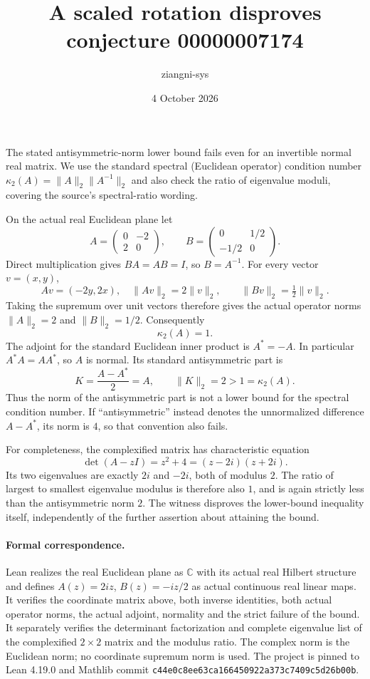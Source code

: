 \documentclass[11pt]{article}
\title{A scaled rotation disproves conjecture 00000007174}
\author{ziangni-sys}
\date{4 October 2026}
\begin{document}
\maketitle
The stated antisymmetric-norm lower bound fails even for an invertible
normal real matrix. We use the standard spectral (Euclidean operator)
condition number $\kappa_2(A)=\|A\|_2\|A^{-1}\|_2$ and also check the
ratio of eigenvalue moduli, covering the source's spectral-ratio wording.

On the actual real Euclidean plane let
\[
A=\begin{pmatrix}0&-2\\2&0\end{pmatrix},\qquad
B=\begin{pmatrix}0&1/2\\-1/2&0\end{pmatrix}.
\]
Direct multiplication gives $BA=AB=I$, so $B=A^{-1}$.
For every vector $v=(x,y)$,
\[
Av=(-2y,2x),\quad \|Av\|_2=2\|v\|_2,
\qquad \|Bv\|_2=\tfrac12\|v\|_2.
\]
Taking the supremum over unit vectors therefore gives the actual
operator norms $\|A\|_2=2$ and $\|B\|_2=1/2$. Consequently
\[
\kappa_2(A)=1.
\]
The adjoint for the standard Euclidean inner product is $A^*=-A$.
In particular $A^*A=AA^*$, so $A$ is normal. Its standard antisymmetric
part is
\[
K=\frac{A-A^*}{2}=A,\qquad \|K\|_2=2>1=\kappa_2(A).
\]
Thus the norm of the antisymmetric part is not a lower bound for the
spectral condition number. If ``antisymmetric'' instead denotes the
unnormalized difference $A-A^*$, its norm is $4$, so that convention
also fails.

For completeness, the complexified matrix has characteristic equation
\[
\det(A-zI)=z^2+4=(z-2i)(z+2i).
\]
Its two eigenvalues are exactly $2i$ and $-2i$, both of modulus $2$.
The ratio of largest to smallest eigenvalue modulus is therefore also
$1$, and is again strictly less than the antisymmetric norm $2$.
The witness disproves the lower-bound inequality itself, independently
of the further assertion about attaining the bound.

\paragraph{Formal correspondence.}
Lean realizes the real Euclidean plane as $\mathbb C$ with its actual
real Hilbert structure and defines $A(z)=2iz$, $B(z)=-iz/2$ as actual
continuous real linear maps. It verifies the coordinate matrix above,
both inverse identities, both actual operator norms, the actual adjoint,
normality and the strict failure of the bound. It separately verifies
the determinant factorization and complete eigenvalue list of the
complexified $2\times2$ matrix and the modulus ratio. The complex norm
is the Euclidean norm; no coordinate supremum norm is used. The project
is pinned to Lean 4.19.0 and Mathlib commit
\texttt{c44e0c8ee63ca166450922a373c7409c5d26b00b}.
\end{document}
